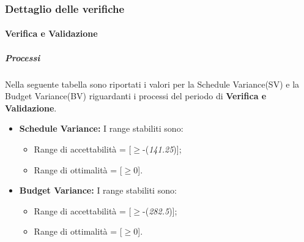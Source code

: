   \subsubsection{Dettaglio delle verifiche}
    \paragraph{Verifica e Validazione}
      \subparagraph{Processi}
      Nella seguente tabella sono riportati i valori per la Schedule Variance(SV) e la Budget Variance(BV) riguardanti i processi del periodo di \textbf{Verifica e Validazione}.\\
      \begin{itemize}
      \item \textbf{Schedule Variance:} I range stabiliti sono:
      \begin{itemize}
        \item Range di accettabilità = [\(\geq\)-(\emph{141.25})];
        \item Range di ottimalità = [\(\geq\)0].
      \end{itemize}
      
      \item \textbf{Budget Variance:} I range stabiliti sono:
      \begin{itemize}
        \item Range di accettabilità = [\(\geq\)-(\emph{282.5})];
        \item Range di ottimalità = [\(\geq\)0].
      \end{itemize}
      
      \end{itemize}
       
